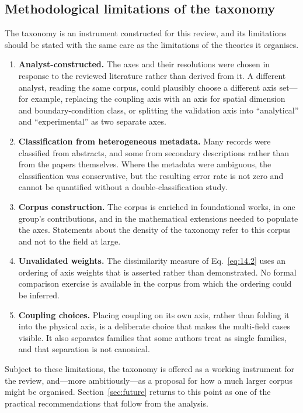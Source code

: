 \subsection{Methodological limitations of the taxonomy}
\label{sec:14.7}

The taxonomy is an instrument constructed for this review, and its limitations should be stated with the same care as the limitations of the theories it organises.

\begin{enumerate}
\item \textbf{Analyst-constructed.} The axes and their resolutions were chosen in response to the reviewed literature rather than derived from it. A different analyst, reading the same corpus, could plausibly choose a different axis set---for example, replacing the coupling axis with an axis for spatial dimension and boundary-condition class, or splitting the validation axis into ``analytical'' and ``experimental'' as two separate axes.
\item \textbf{Classification from heterogeneous metadata.} Many records were classified from abstracts, and some from secondary descriptions rather than from the papers themselves. Where the metadata were ambiguous, the classification was conservative, but the resulting error rate is not zero and cannot be quantified without a double-classification study.
\item \textbf{Corpus construction.} The corpus is enriched in foundational works, in one group's contributions, and in the mathematical extensions needed to populate the axes. Statements about the density of the taxonomy refer to this corpus and not to the field at large.
\item \textbf{Unvalidated weights.} The dissimilarity measure of Eq.~\eqref{eq:14.2} uses an ordering of axis weights that is asserted rather than demonstrated. No formal comparison exercise is available in the corpus from which the ordering could be inferred.
\item \textbf{Coupling choices.} Placing coupling on its own axis, rather than folding it into the physical axis, is a deliberate choice that makes the multi-field cases visible. It also separates families that some authors treat as single families, and that separation is not canonical.
\end{enumerate}

Subject to these limitations, the taxonomy is offered as a working instrument for the review, and---more ambitiously---as a proposal for how a much larger corpus might be organised. Section~\ref{sec:future} returns to this point as one of the practical recommendations that follow from the analysis.


